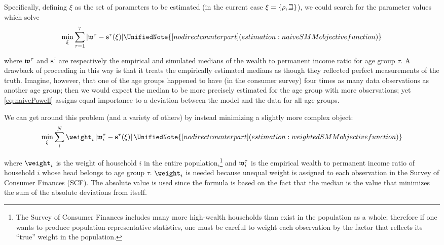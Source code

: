 Specifically, defining $\xi$ as the set of parameters
to be estimated (in the current case $\xi =\{\rho ,\beth\}$), we could search for
the parameter values which solve
  \begin{equation}
    \begin{gathered}
      \begin{aligned}
        \min_{\xi} \sum_{\tau=1}^{7} |\wRatio^{\tau} -\mathbf{s}^{\tau}(\xi)|  \label{eq:naivePowell}
        \UnifiedNote{[no direct counterpart] (estimation: naive SMM objective function)}
      \end{aligned}
    \end{gathered}
  \end{equation}

where $\mathfrak{w}^{\tau}$ and $\mathbf{s}^{\tau}$ are respectively the empirical
and simulated medians of the wealth to permanent income ratio for age group $\tau$.
A drawback of proceeding in this way is that it treats the empirically
estimated medians as though they reflected perfect measurements of the
truth. Imagine, however, that one of the age groups happened to have
(in the consumer survey) four times as many data observations as
another age group; then we would expect the median to be more
precisely estimated for the age group with more observations; yet
\eqref{eq:naivePowell} assigns equal importance to a deviation between
the model and the data for all age groups.

We can get around this problem (and a variety of others) by instead minimizing a slightly more complex object:
\hypertarget{eq-StructEstim}{}
  \begin{equation}
    \min_{\xi}\sum_{i}^{N}\weight _{i}\left|\wRatio_{i}^{\tau }-\mathbf{s}^{\tau}(\xi )\right|\label{eq:StructEstim}
    \UnifiedNote{[no direct counterpart] (estimation: weighted SMM objective function)}
  \end{equation}

where $\weight_{i}$ is the weight of household $i$ in the entire
population,\footnote{The Survey of Consumer Finances includes many
  more high-wealth households than exist in the population as a whole;
  therefore if one wants to produce population-representative
  statistics, one must be careful to weight each observation by the
  factor that reflects its ``true'' weight in the population.} and
$\mathfrak{w}_{i}^{\tau}$ is the empirical wealth to permanent income
ratio of household $i$ whose head belongs to age group
$\tau$. $\weight _{i}$ is needed because unequal weight is assigned to
each observation in the Survey of Consumer Finances (SCF). The
absolute value is used since the formula is based on the fact that the
median is the value that minimizes the sum of the absolute deviations
from itself.

